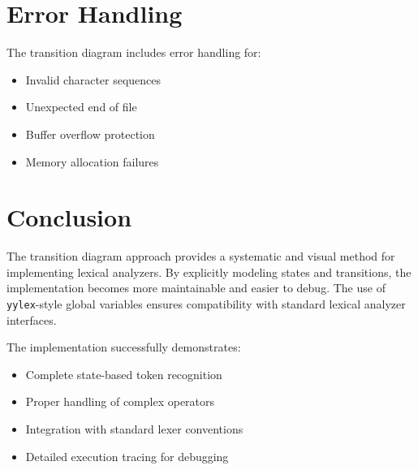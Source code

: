 \documentclass[12pt,a4paper]{article}
\begin{document}
\section{Error Handling}
The transition diagram includes error handling for:
\begin{itemize}
    \item Invalid character sequences
    \item Unexpected end of file
    \item Buffer overflow protection
    \item Memory allocation failures
\end{itemize}

\section{Conclusion}
The transition diagram approach provides a systematic and visual method for implementing lexical analyzers. By explicitly modeling states and transitions, the implementation becomes more maintainable and easier to debug. The use of \texttt{yylex}-style global variables ensures compatibility with standard lexical analyzer interfaces.

The implementation successfully demonstrates:
\begin{itemize}
    \item Complete state-based token recognition
    \item Proper handling of complex operators
    \item Integration with standard lexer conventions
    \item Detailed execution tracing for debugging
\end{itemize}
\end{document}
